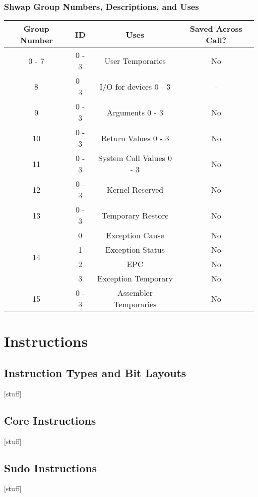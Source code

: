 \documentclass{article}
\begin{document}
		\subsubsection{Shwap Group Numbers, Descriptions, and Uses}
			\begin{center}
				\begin{tabular}{| c | c | c | c |}
					\hline
				    	Group Number   & ID    & Uses                     & Saved Across Call? \\ \hline
					    0 - 7          & 0 - 3 & User Temporaries         & No \\ \hline
					    8              & 0 - 3 & I/O for devices 0 - 3    & -  \\ \hline
					    9              & 0 - 3 & Arguments 0 - 3          & No \\ \hline
					    10             & 0 - 3 & Return Values 0 - 3      & No \\ \hline
					    11             & 0 - 3 & System Call Values 0 - 3 & No \\ \hline
				    	12             & 0 - 3 & Kernel Reserved          & No \\ \hline
					    13             & 0 - 3 & Temporary Restore        & No \\ \hline 
					    \multirow{4}{*}{14} & 0 & Exception Cause         & No \\
					    			   & 1     & Exception Status         & No \\
								       & 2     & EPC                      & No \\
								       & 3     & Exception Temporary      & No \\ \hline
					    15             & 0 - 3 & Assembler Temporaries    & No \\
					\hline
				\end{tabular}
			\end{center}
\section{Instructions}
	\subsection{Instruction Types and Bit Layouts}
		[stuff]
	\subsection{Core Instructions}
		[stuff]
	\subsection{Sudo Instructions}
		[stuff]
\end{document}
